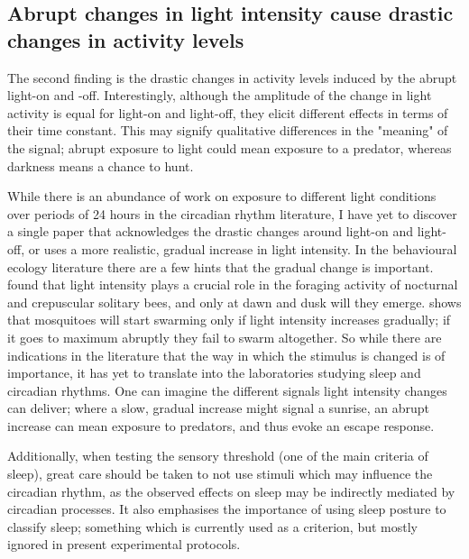 \subsection{Abrupt changes in light intensity cause drastic changes in activity levels} \label{light-change}
The second finding is the drastic changes in activity levels induced by the abrupt light-on and -off. Interestingly, although the amplitude of the change in light activity is equal for light-on and light-off, they elicit different effects in terms of their time constant. This may signify qualitative differences in the "meaning" of the signal; abrupt exposure to light could mean exposure to a predator, whereas darkness means a chance to hunt. \par
While there is an abundance of work on exposure to different light conditions over periods of 24 hours in the circadian rhythm literature, I have yet to discover a single paper that acknowledges the drastic changes around light-on and light-off, or uses a more realistic, gradual increase in light intensity. In the behavioural ecology literature there are a few hints that the gradual change is important. \cite{Kelber2006} found that light intensity plays a crucial role in the foraging activity of nocturnal and crepuscular solitary bees, and only at dawn and dusk will they emerge. \cite{Nielsen1962} shows that mosquitoes will start swarming only if light intensity increases gradually; if it goes to maximum abruptly they fail to swarm altogether. So while there are indications in the literature that the way in which the stimulus is changed is of importance, it has yet to translate into the laboratories studying sleep and circadian rhythms. One can imagine the different signals light intensity changes can deliver; where a slow, gradual increase might signal a sunrise, an abrupt increase can mean exposure to predators, and thus evoke an escape response. \par
Additionally, when testing the sensory threshold (one of the main criteria of sleep), great care should be taken to not use stimuli which may influence the circadian rhythm, as the observed effects on sleep may be indirectly mediated by circadian processes. It also emphasises the importance of using sleep posture to classify sleep; something which is currently used as a criterion, but mostly ignored in present experimental protocols.


